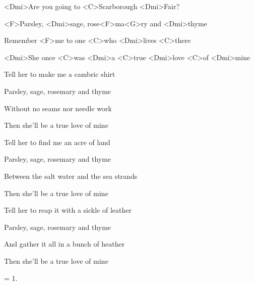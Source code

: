 

\zs
<Dmi>Are you going to <C>Scarborough <Dmi>Fair?

<F>Parsley, <Dmi>sage, rose<F>ma<G>ry and <Dmi>thyme

Remember <F>me to one <C>who <Dmi>lives <C>there

<Dmi>She once <C>was <Dmi>a <C>true <Dmi>love <C>of <Dmi>mine
\ks

\zs
Tell her to make me a cambric shirt

Parsley, sage, rosemary and thyme

Without no seams nor needle work

Then she'll be a true love of mine
\ks

\zs
Tell her to find me an acre of land

Parsley, sage, rosemary and thyme

Between the salt water and the sea strands

Then she'll be a true love of mine
\ks

\zs
Tell her to reap it with a sickle of leather

Parsley, sage, rosemary and thyme

And gather it all in a bunch of heather

Then she'll be a true love of mine
\ks

\zs
= 1.
\ks

\kp
